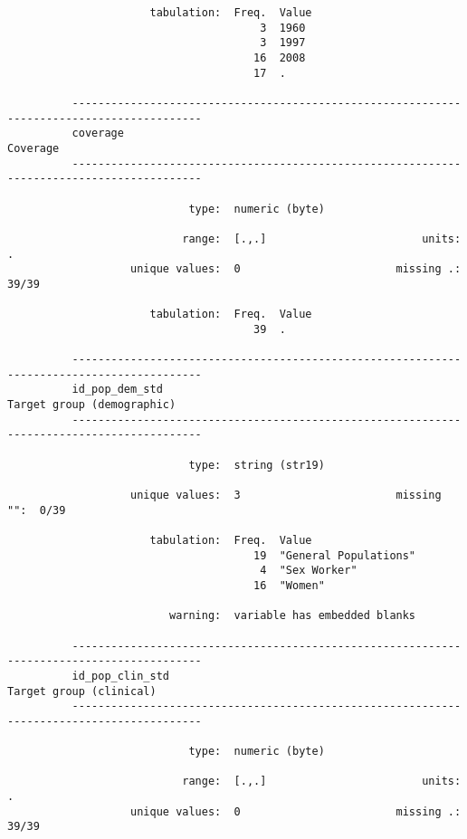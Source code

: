 \documentclass{article}
\begin{document}
\begin{verbatim}
                      tabulation:  Freq.  Value
                                       3  1960
                                       3  1997
                                      16  2008
                                      17  .
          
          ------------------------------------------------------------------------------------------
          coverage                                                                          Coverage
          ------------------------------------------------------------------------------------------
          
                            type:  numeric (byte)
          
                           range:  [.,.]                        units:  .
                   unique values:  0                        missing .:  39/39
          
                      tabulation:  Freq.  Value
                                      39  .
          
          ------------------------------------------------------------------------------------------
          id_pop_dem_std                                                  Target group (demographic)
          ------------------------------------------------------------------------------------------
          
                            type:  string (str19)
          
                   unique values:  3                        missing "":  0/39
          
                      tabulation:  Freq.  Value
                                      19  "General Populations"
                                       4  "Sex Worker"
                                      16  "Women"
          
                         warning:  variable has embedded blanks
          
          ------------------------------------------------------------------------------------------
          id_pop_clin_std                                                    Target group (clinical)
          ------------------------------------------------------------------------------------------
          
                            type:  numeric (byte)
          
                           range:  [.,.]                        units:  .
                   unique values:  0                        missing .:  39/39
          

\end{verbatim}
\end{document}
